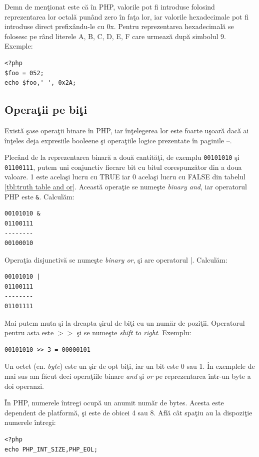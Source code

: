 Demn de menţionat este că în PHP, valorile pot fi introduse
folosind reprezentarea lor octală punând zero în faţa lor, iar
valorile hexadecimale pot fi introduse direct prefixându-le cu 0x.
Pentru reprezentarea hexadecimală se folosesc pe rând literele A, B, C,
D, E, F care urmează după simbolul 9.
Exemple:
\begin{lstlisting}
<?php
$foo = 052;
echo $foo,' ', 0x2A;
\end{lstlisting}

\subsection{Operaţii pe biţi}
Există şase operaţii binare în PHP, iar înţelegerea lor este
foarte uşoară dacă ai înţeles deja expresiile booleene şi
operaţiile logice prezentate în paginile
\pageref{sec:tipul de date boolean. Expresii logice}--\pageref{endsec:tipul de date boolean. Expresii logice}.

Plecând de la reprezentarea binară a două cantităţi, de exemplu \texttt{00101010} şi
\texttt{01100111}, putem uni conjunctiv fiecare bit cu bitul corespunzător din a doua valoare.
1 este acelaşi lucru cu TRUE iar 0 acelaşi lucru cu FALSE din tabelul \ref{tbl:truth table and or}.
Această operaţie se numeşte \textsl{binary and}, iar operatorul PHP este \texttt{\&}.
Calculăm:
\begin{verbatim}
00101010 &
01100111
--------
00100010
\end{verbatim}

Operaţia disjunctivă se numeşte \textsl{binary or}, şi are operatorul |. Calculăm:
\begin{verbatim}
00101010 |
01100111
--------
01101111
\end{verbatim}

Mai putem muta şi la dreapta şirul de biţi cu un număr de poziţii. Operatorul
pentru asta este \texttt{$>>$} şi se numeşte \textsl{shift to right}. Exemplu:
\begin{verbatim}
00101010 >> 3 = 00000101
\end{verbatim}

Un octet (en. \textsl{byte}) este un şir de opt biţi,
iar un bit este 0 sau 1. În exemplele de mai sus am făcut deci operaţiile binare
\textit{and} şi \textit{or} pe reprezentarea într-un byte a doi operanzi.

În PHP, numerele întregi ocupă un anumit număr de bytes. Acesta este dependent de
platformă, şi este de obicei 4 sau 8. Află cât spaţiu au la dispoziţie numerele
întregi:
\begin{lstlisting}
<?php
echo PHP_INT_SIZE,PHP_EOL;
\end{lstlisting}

